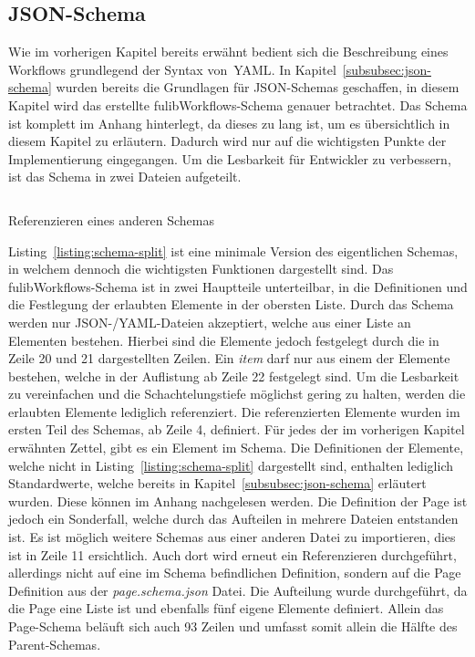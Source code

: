 \subsection{JSON-Schema}\label{subsec:schema}
Wie im vorherigen Kapitel bereits erwähnt bedient sich die Beschreibung eines Workflows grundlegend der Syntax von~\ac{YAML}.
In Kapitel~\ref{subsubsec:json-schema} wurden bereits die Grundlagen für JSON-Schemas geschaffen, in diesem Kapitel wird das erstellte
fulibWorkflows-Schema genauer betrachtet.
Das Schema ist komplett im Anhang hinterlegt, da dieses zu lang ist, um es übersichtlich in diesem Kapitel zu erläutern.
Dadurch wird nur auf die wichtigsten Punkte der Implementierung eingegangen.
Um die Lesbarkeit für Entwickler zu verbessern, ist das Schema in zwei Dateien aufgeteilt.

\begin{listing}[!ht]
    \inputminted[xleftmargin=20pt,linenos]{json}{listings/3.1.2/page.json}
    \caption{Referenzieren eines anderen Schemas}
    \label{listing:schema-split}
\end{listing}

Listing~\ref{listing:schema-split} ist eine minimale Version des eigentlichen Schemas, in welchem dennoch die wichtigsten Funktionen dargestellt sind.
Das fulibWorkflows-Schema ist in zwei Hauptteile unterteilbar, in die Definitionen und die Festlegung der erlaubten Elemente in der obersten Liste.
Durch das Schema werden nur JSON-/YAML-Dateien akzeptiert, welche aus einer Liste an Elementen bestehen.
Hierbei sind die Elemente jedoch festgelegt durch die in Zeile 20 und 21 dargestellten Zeilen.
Ein \textit{item} darf nur aus einem der Elemente bestehen, welche in der Auflistung ab Zeile 22 festgelegt sind.
Um die Lesbarkeit zu vereinfachen und die Schachtelungstiefe möglichst gering zu halten, werden die erlaubten Elemente lediglich referenziert.
Die referenzierten Elemente wurden im ersten Teil des Schemas, ab Zeile 4, definiert.
Für jedes der im vorherigen Kapitel erwähnten Zettel, gibt es ein Element im Schema.
Die Definitionen der Elemente, welche nicht in Listing~\ref{listing:schema-split} dargestellt sind, enthalten lediglich Standardwerte, welche bereits in Kapitel~\ref{subsubsec:json-schema} erläutert wurden.
Diese können im Anhang nachgelesen werden.
Die Definition der Page ist jedoch ein Sonderfall, welche durch das Aufteilen in mehrere Dateien entstanden ist.
Es ist möglich weitere Schemas aus einer anderen Datei zu importieren, dies ist in Zeile 11 ersichtlich.
Auch dort wird erneut ein Referenzieren durchgeführt, allerdings nicht auf eine im Schema befindlichen Definition, sondern auf die Page Definition aus der \textit{page.schema.json} Datei.
Die Aufteilung wurde durchgeführt, da die Page eine Liste ist und ebenfalls fünf eigene Elemente definiert.
Allein das Page-Schema beläuft sich auch 93 Zeilen und umfasst somit allein die Hälfte des Parent-Schemas.


